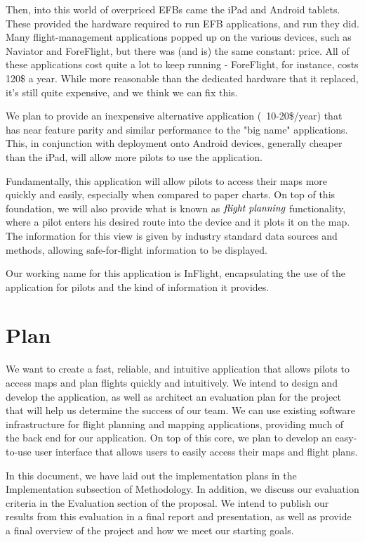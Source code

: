 \documentclass[10pt,a4paper]{article}
\begin{document}
Then, into this world of overpriced EFBs came the iPad and Android tablets. These provided the hardware required to run EFB applications, and run they did. Many flight-management applications popped up on the various devices, such as Naviator and ForeFlight, but there was (and is) the same constant: price. All of these applications cost quite a lot to keep running - ForeFlight, for instance, costs 120\$ a year. While more reasonable than the dedicated hardware that it replaced, it's still quite expensive, and we think we can fix this.

We plan to provide an inexpensive alternative application (~10-20\$/year) that has near feature parity and similar performance to the "big name" applications. This, in conjunction with deployment onto Android devices, generally cheaper than the iPad, will allow more pilots to use the application.

Fundamentally, this application will allow pilots to access their maps more quickly and easily, especially when compared to paper charts. On top of this foundation, we will also provide what is known as $\emph{flight planning}$ functionality, where a pilot enters his desired route into the device and it plots it on the map. The information for this view is given by industry standard data sources and methods, allowing safe-for-flight information to be displayed.

Our working name for this application is InFlight, encapsulating the use of the application for pilots and the kind of information it provides.
\section{Plan}
We want to create a fast, reliable, and intuitive application that allows pilots to access maps and plan flights quickly and intuitively. We intend to design and develop the application, as well as architect an evaluation plan for the project that will help us determine the success of our team. We can use existing software infrastructure for flight planning and mapping applications, providing much of the back end for our application. On top of this core, we plan to develop an easy-to-use user interface that allows users to easily access their maps and flight plans. 

In this document, we have laid out the implementation plans in the Implementation subsection of Methodology. In addition, we discuss our evaluation criteria in the Evaluation section of the proposal. We intend to publish our results from this evaluation in a final report and presentation, as well as provide a final overview of the project and how we meet our starting goals.
\end{document}
